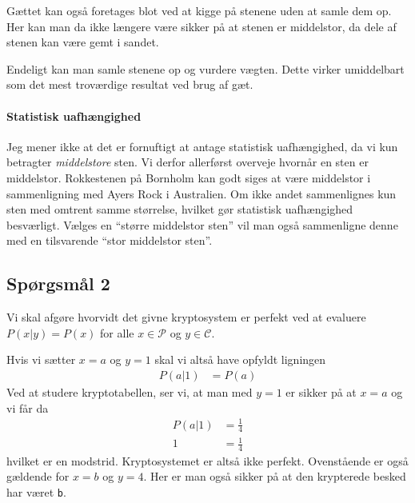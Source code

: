 \documentclass[a4paper, 11pt, danish, final]{article}
\begin{document}
Gættet kan også foretages blot ved at kigge på stenene uden at samle
dem op. Her kan man da ikke længere være sikker på at stenen er
middelstor, da dele af stenen kan være gemt i sandet.

Endeligt kan man samle stenene op og vurdere vægten. Dette virker
umiddelbart som det mest troværdige resultat ved brug af gæt.

\paragraph{Statistisk uafhængighed}
Jeg mener ikke at det er fornuftigt at antage statistisk uafhængighed,
da vi kun betragter \emph{middelstore} sten. Vi derfor allerførst
overveje hvornår en sten er middelstor. Rokkestenen på Bornholm kan godt
siges at være middelstor i sammenligning med Ayers Rock i Australien. Om
ikke andet sammenlignes kun sten med omtrent samme størrelse, hvilket
gør statistisk uafhængighed besværligt. Vælges en ``større middelstor
sten'' vil man også sammenligne denne med en tilsvarende ``stor
middelstor sten''.

\subsection*{Spørgsmål 2}
Vi skal afgøre hvorvidt det givne kryptosystem er perfekt ved at
evaluere $P(x|y) = P(x)$ for alle $x \in \mathcal{P}$ og $y \in
\mathcal{C}$.

Hvis vi sætter $x = a$ og $y = 1$ skal vi altså have opfyldt ligningen
\begin{align}
    P(a|1) &= P(a)
\end{align}
Ved at studere kryptotabellen, ser vi, at man med $y = 1$ er sikker på
at $x = a$ og vi får da
\begin{align}
    P(a|1) &= \frac{1}{4}\\
    1 &= \frac{1}{4}
\end{align}
hvilket er en modstrid. Kryptosystemet er altså ikke perfekt.
Ovenstående er også gældende for $x = b$ og $y = 4$. Her er man også
sikker på at den krypterede besked har været \texttt{b}.


%
%
\end{document}

